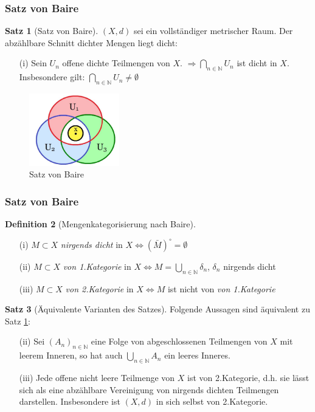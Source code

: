 \documentclass[t, handout]{beamer}
\newcommand{\N}{\mathbb{N}}
\theoremstyle{definition} %
\newtheorem{sa}{Satz}[section] %
\newtheorem{dfi}[sa]{Definition} %
\begin{document}
\begin{frame}
\frametitle{Satz von Baire}
\begin{sa}[Satz von Baire]
\label{sa_baire}
$(X,d)$ sei ein vollständiger metrischer Raum. Der abzählbare Schnitt dichter Mengen liegt dicht:
\begin{itemize}
\item[(i)] Sein $U_n$ offene dichte Teilmengen von $X$. $\Rightarrow \bigcap\limits_{n \in \N}{U_n}$ ist dicht in $X$. Insbesondere gilt: $\bigcap\limits_{n \in \N}{U_n} \neq \emptyset$
\end{itemize}
\end{sa}
\begin{figure}
\includegraphics[width=0.35\textwidth]{pictures/baire.png}
\caption{Satz von Baire}
\end{figure}
\end{frame}

\begin{frame}
\frametitle{Satz von Baire}
\begin{dfi}[Mengenkategorisierung nach Baire]
\begin{itemize}
\item[(i)] $M \subset X$ \textit{nirgends dicht} in $X \Leftrightarrow (\bar{M})^\circ = \emptyset$
\item[(ii)] $M \subset X$ \textit{von 1.Kategorie} in $X \Leftrightarrow M = \bigcup\limits_{n \in \N}{\delta_n}$, $\delta_n$ nirgends dicht
\item[(iii)] $M \subset X$ \textit{von 2.Kategorie} in $X \Leftrightarrow M$ ist nicht von \textit{von 1.Kategorie}
\end{itemize}
\end{dfi}
\pause
\begin{sa}[Äquivalente Varianten des Satzes]
Folgende Aussagen sind äquivalent zu Satz \hyperref[sa_baire]{\ref*{sa_baire}}:
\begin{itemize}
\item[(ii)] Sei $(A_n)_{n \in \N}$ eine Folge von abgeschlossenen Teilmengen von $X$ mit leerem Inneren, so hat auch $\bigcup\limits_{n \in \N}{A_n}$ ein leeres Inneres. 
\item[(iii)] Jede offene nicht leere Teilmenge von $X$ ist von 2.Kategorie, d.h. sie lässt sich als eine abzählbare Vereinigung von nirgends dichten Teilmengen darstellen. Insbesondere ist $(X,d)$ in sich selbst von 2.Kategorie.
\end{itemize}
\end{sa}
\end{frame}
\end{document}
